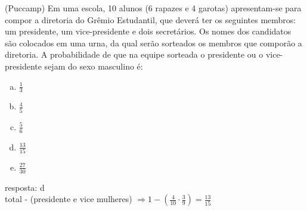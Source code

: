 \begin{ex}
 (Puccamp) Em uma escola, 10 alunos  (6 rapazes e 4 garotas) apresentam-se para compor a diretoria do Grêmio Estudantil, que deverá ter os seguintes membros: um presidente, um vice-presidente e dois secretários. Os nomes dos candidatos são colocados em uma urna, da qual serão sorteados os membros que comporão a diretoria. A probabilidade de que na equipe sorteada o presidente ou o vice-presidente sejam do sexo masculino  é:
    \begin{enumerate}[(a)]
    \item $\frac{1}{3}$
    \item $\frac{4}{5}$
    \item $\frac{5}{6}$
    \item $\frac{13}{15}$
    \item $\frac{27}{30}$
    \end{enumerate}
      \begin{sol}
       resposta: d \\
       total - (presidente e vice mulheres) 
       $ \Longrightarrow1- (\frac{4}{10}\cdot\frac{3}{9})=\frac{13}{15}$
      \end{sol}
\end{ex}